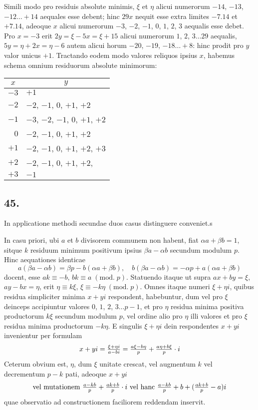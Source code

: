 \documentclass[twoside,12pt, showframe]{memoir}
\renewcommand{\pmod}[1]{\;(\textrm{mod.}\;#1)}
\let\oldfrac\frac
\def\frac#1#2{\mathchoice{\tfrac{#1}{#2}}{\oldfrac{#1}{#2}}{\genfrac{}{}{}{2}{#1}{#2\mathstrut}}{\genfrac{}{}{}{3}{#1}{#2\mathstrut}}}
\begin{document}
Simili modo pro residuis absolute minimis, \(\xi\) et \(\eta\) alicui numerorum \(-14\), \(-13\), \(-12 \ldots+14\) aequales esse debent; hinc \(29 x\) nequit esse extra limites \(-7.14\) et \(+7.14\), adeoque \(x\) alicui numerorum \(-3\), \(-2\), \(-1\), \(0\), \(1\), \(2\), \(3\) aequalis esse debet. Pro \(x=-3\) erit \(2 y=\xi-5 x=\xi+15\) alicui numerorum \(1\), \(2\), \(3 \ldots 29\) aequalis, \(5 y=\eta+2 x=\eta-6\) autem alicui horum \(-20\), \(-19\), \(-18 \ldots+8\): hinc prodit pro \(y\) valor unicus \(+1\). Tractando eodem modo valores reliquos ipsius \(x\), habemus schema omnium residuorum absolute minimorum:
\begin{center}
\begin{tabular}{r|l}
\multicolumn{1}{c|}{\(x\)} & \multicolumn{1}{c}{\(y\)} \\
\hline
\(-3\) & \(+1\) \\
\(-2\) & \(-2\), \(-1\), \(0\), \(+1\), \(+2\) \\
\(-1\) & \(-3\), \(-2\), \(-1\), \(0\), \(+1\), \(+2\) \\
\(0\) & \(-2\), \(-1\), \(0\), \(+1\), \(+2\) \\
\(+1\) & \(-2\), \(-1\), \(0\), \(+1\), \(+2\), \(+3\) \\
\(+2\) & \(-2\), \(-1\), \(0\), \(+1\), \(+2\), \\
\(+3\) & \(-1\) \\
\end{tabular}
\end{center}

\subsection*{45.}
 
In applicatione methodi secundae duos casus distinguere conveniet.s
 
In casu priori, ubi \(a\) et \(b\) divisorem communem non habent, fiat \(\alpha a+\beta b=1\), sitque \(k\) residuum minimum positivum ipsius \(\beta a-\alpha b\) secundum modulum \(p\). Hinc aequationes identicae
\[a(\beta a-\alpha b)=\beta p-b(\alpha a+\beta b), \quad b(\beta a-\alpha b)=-\alpha p+a(\alpha a+\beta b)\]
docent, esse \(a k \equiv-b\), \(b k \equiv a\pmod{p}\). Statuendo itaque ut supra \(a x+b y=\xi\),\clearpage\noindent%
\(a y-b x=\eta\), erit \(\eta \equiv k \xi\), \(\xi \equiv-k \eta\pmod{p}\). Omnes itaque numeri \(\xi+\eta i\), quibus residua simpliciter minima \(x+y i\) respondent, habebuntur, dum vel pro \(\xi\) deinceps accipiuntur valores \(0\), \(1\), \(2\), \(3 \ldots p-1\), et pro \(\eta\) residua minima positiva productorum \(k \xi\) secundum modulum \(p\), vel ordine alio pro \(\eta\) illi valores et pro \(\xi\) residua minima productorum \(-k \eta\). E singulis \(\xi+\eta i\) dein respondentes \(x+y i\) invenientur per formulam
\[x+y i=\frac{\xi+\eta i}{a-b i}=\frac{a \xi-b \eta}{p}+\frac{a \eta+b \xi}{p} \cdot i\]
Ceterum obvium est, \(\eta\), dum \(\xi\) unitate crescat, vel augmentum \(k\) vel decrementum \(p-k\) pati, adeoque \(x+y i\)
\[\text{vel mutationem \(\frac{a-k b}{p}+\frac{a k+b}{p} \cdot i\) vel hanc \(\frac{a-k b}{p}+b+(\frac{a k+b}{p}-a) i\)}\]
quae observatio ad constructionem faciliorem reddendam inservit.
\end{document}
